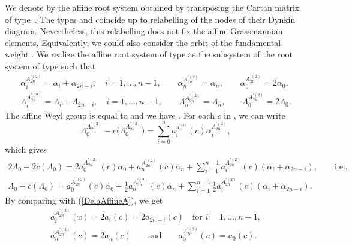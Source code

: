 \documentclass[pdftex]{sigma}
\numberwithin{equation}{section}
\begin{document}
We denote by  the affine root system obtained by
transposing the Cartan matrix of type~. The types 
and  coincide up to relabelling of the
nodes of their Dynkin diagram. Nevertheless, this relabelling does not fix
the affine Grassmannian elements. Equivalently, we could also consider the
orbit of the fundamental weight . We realize
the affine root system of type  as the subsystem of the
root system of type  such that%
\begin{gather*}
\alpha _{i}^{A_{2n}^{\prime (2)}}=\alpha _{i}+\alpha _{2n-i},\quad i=1,\dots ,n-1,
\qquad
\alpha _{n}^{A_{2n}^{\prime (2)}}=\alpha _{n}, \qquad
\alpha _{0}^{A_{2n}^{\prime (2)}}=2\alpha _{0},\\
\Lambda _{i}^{A_{2n}^{\prime (2)}}=\Lambda _{i}+\Lambda _{2n-i},\quad i=1,\dots,n-1, \qquad
\Lambda _{n}^{A_{2n}^{\prime (2)}}=\Lambda _{n}, \qquad
\Lambda _{0}^{A_{2n}^{\prime (2)}}=2\Lambda _{0}.
\end{gather*}
The affine Weyl group  is equal to 
and we have . For
each $c$ in , we can write
\begin{equation*}
\Lambda _{0}^{A_{2n}^{\prime (2)}}-c\bigl(\Lambda _{0}^{A_{2n}^{\prime
		(2)}}\bigr)=\sum_{i=0}^{n}a_{i}^{_{A_{2n}^{\prime (2)}}}(c)\alpha
_{i}^{A_{2n}^{\prime (2)}},
\end{equation*}
which gives
\begin{gather*}
	2\Lambda _{0}-2c(\Lambda _{0}) =2a_{0}^{A_{2n}^{\prime (2)}}(c)\alpha
	_{0}+a_{n}^{A_{2n}^{\prime (2)}}(c)\alpha
	_{n}+\sum_{i=1}^{n-1}a_{i}^{A_{2n}^{\prime (2)}}(c)(\alpha _{i}+\alpha
	_{2n-i}),\qquad \text{i.e.,} \\
	\Lambda _{0}-c(\Lambda _{0}) =a_{0}^{A_{2n}^{\prime (2)}}(c)\alpha _{0}+
	\frac{1}{2}a_{n}^{A_{2n}^{\prime (2)}}(c)\alpha _{n}+\sum_{i=1}^{n-1}\frac{1%
	}{2 }a_{i}^{A_{2n}^{\prime (2)}}(c)(\alpha _{i}+\alpha _{2n-i}).
\end{gather*}
By comparing with (\ref{DelaAffineA}), we get%
\begin{gather*}
a_{i}^{A_{2n}^{\prime (2)}}(c)=2a_{i}(c)=2a_{2n-i}(c)\quad \text{for }i=1,\dots
,n-1 ,\\
a_{n}^{A_{2n}^{\prime (2)}}(c)=2a_{n}(c)\qquad \text{and} \qquad a_{0}^{A_{2n}^{\prime
		(2)}}(c)=a_{0}(c).
\end{gather*}
\end{document}
